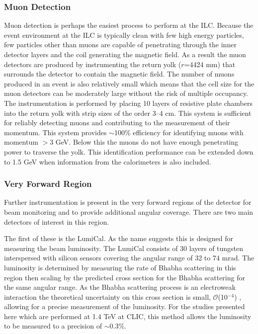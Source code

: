 \subsubsection{Muon Detection}
Muon detection is perhaps the easiest process to perform at the ILC. Because the event environment at the ILC is typically clean with few high energy particles, few particles other than muons are capable of penetrating through the inner detector layers and the coil generating the magnetic field. As a result the muon detectors are produced by instrumenting the return yolk ($r$=4424 mm) that surrounds the detector to contain the magnetic field. The number of muons produced in an event is also relatively small which means that the cell size for the muon detectors can be moderately large without the risk of multiple occupancy. The instrumentation is performed by placing 10 layers of resistive plate chambers into the return yolk with strip sizes of the order 3--4 cm. This system is sufficient for reliably detecting muons and contributing to the measurement of their momentum. This system provides $\sim$100\% efficiency for identifying muons with momentum $>$3 GeV. Below this the muons do not have enough penetrating power to traverse the yolk. This identification performance can be extended down to 1.5 GeV when information from the calorimeters is also included.

\subsubsection{Very Forward Region}

Further instrumentation is present in the very forward regions of the detector for beam monitoring and to provide additional angular coverage. There are two main detectors of interest in this region.

The first of these is the LumiCal. As the name suggests this is designed for measuring the beam luminosity. The LumiCal consists of 30 layers of tungsten interspersed with silicon sensors covering the angular range of 32 to 74 mrad. The luminosity is determined by measuring the rate of Bhabha scattering in this region then scaling by the predicted cross section for the Bhabha scattering for the same angular range. As the Bhabha scattering process is an electroweak interaction the theoretical uncertainty on this cross section is small, $\mathcal{O}$(10$^{-4}$) \cite{BozovicJelisavcic:2010hy}, allowing for a precise measurement of the luminosity. For the studies presented here which are performed at 1.4 TeV at CLIC, this method allows the luminosity to be measured to a precision of $\sim$0.3\%.


